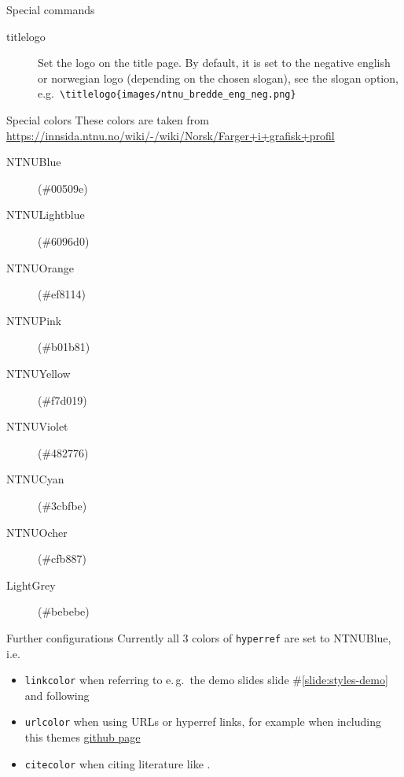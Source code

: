 \documentclass[aspectratio=169]{beamer}
\begin{document}
		\begin{frame}[fragile]{Special commands}
			\begin{description}
				\item[titlelogo]
				Set the logo on the title page. By default, it is set to the negative english or norwegian logo (depending on the chosen slogan), see the slogan option, e.g.\,
				\lstinline!\titlelogo{images/ntnu_bredde_eng_neg.png}!
			\end{description}
		\end{frame}
		
		\begin{frame}{Special colors}
	 		These colors are taken from \url{https://innsida.ntnu.no/wiki/-/wiki/Norsk/Farger+i+grafisk+profil}
			\begin{description}
				\item[{\color{NTNUBlue} NTNUBlue}] (\#{\color{NTNUBlue}00509e})
				\item[{\color{NTNULightblue} NTNULightblue}] (\#{\color{NTNULightblue}6096d0})
				\item[{\color{NTNUOrange} NTNUOrange}] (\#{\color{NTNUOrange}ef8114})
				\item[{\color{NTNUPink} NTNUPink}] (\#{\color{NTNUPink}b01b81})
				\item[{\color{NTNUYellow} NTNUYellow}] (\#{\color{NTNUYellow}f7d019})
				\item[{\color{NTNUViolet} NTNUViolet}] (\#{\color{NTNUViolet}482776})
				\item[{\color{NTNUCyan} NTNUCyan}] (\#{\color{NTNUCyan}3cbfbe})
				\item[{\color{NTNUOcher} NTNUOcher}] (\#{\color{NTNUOcher}cfb887})
				\item[{\color{LightGrey} LightGrey}] (\#{\color{LightGrey}bebebe})
			\end{description}
		\end{frame}
		
		\begin{frame}{Further configurations}
			Currently all 3 colors of \lstinline!hyperref! are set to {\color{NTNUBlue} NTNUBlue}, i.e.
			\begin{itemize}
				\item \lstinline!linkcolor! when referring to e.\,g.\ the demo slides slide \#\ref{slide:styles-demo} and following
				\item \lstinline!urlcolor! when using URLs or hyperref links, for example when including this themes \href{https://github.com/ntnu-tex/beamerthementnu}{github page}
				\item \lstinline!citecolor! when citing literature like .
			\end{itemize}
		\end{frame}
		
\end{document}
